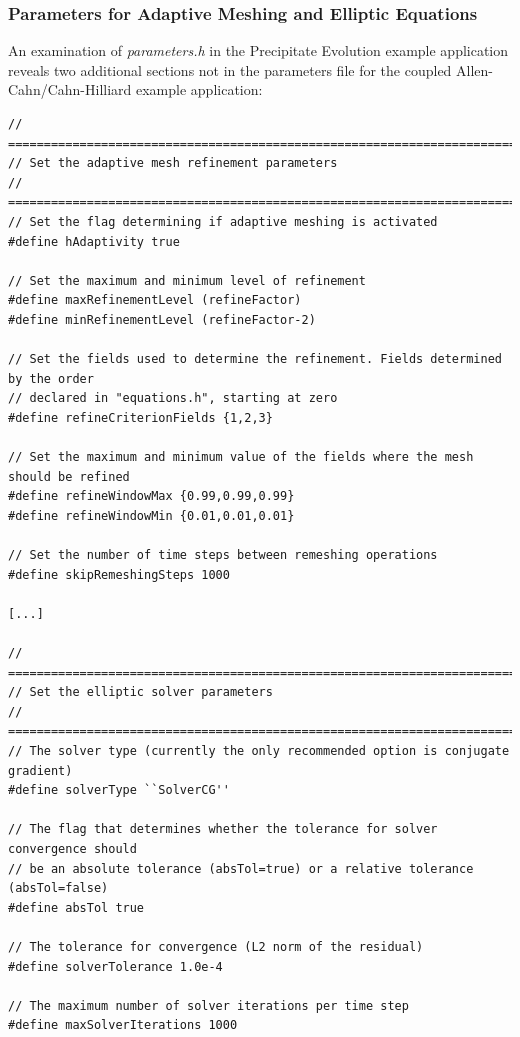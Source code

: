 \documentclass[10pt]{article} %
\begin{document}
\subsubsection{Parameters for Adaptive Meshing and Elliptic Equations}
An examination of \emph{parameters.h} in the Precipitate Evolution example application reveals two additional sections not in the parameters file for the coupled Allen-Cahn/Cahn-Hilliard example application:
\tiny
\begin{lstlisting}
// =================================================================================
// Set the adaptive mesh refinement parameters
// =================================================================================
// Set the flag determining if adaptive meshing is activated
#define hAdaptivity true

// Set the maximum and minimum level of refinement
#define maxRefinementLevel (refineFactor)
#define minRefinementLevel (refineFactor-2)

// Set the fields used to determine the refinement. Fields determined by the order
// declared in "equations.h", starting at zero
#define refineCriterionFields {1,2,3}

// Set the maximum and minimum value of the fields where the mesh should be refined
#define refineWindowMax {0.99,0.99,0.99}
#define refineWindowMin {0.01,0.01,0.01}

// Set the number of time steps between remeshing operations
#define skipRemeshingSteps 1000

[...]

// =================================================================================
// Set the elliptic solver parameters
// =================================================================================
// The solver type (currently the only recommended option is conjugate gradient)
#define solverType ``SolverCG''

// The flag that determines whether the tolerance for solver convergence should
// be an absolute tolerance (absTol=true) or a relative tolerance (absTol=false)
#define absTol true

// The tolerance for convergence (L2 norm of the residual)
#define solverTolerance 1.0e-4

// The maximum number of solver iterations per time step
#define maxSolverIterations 1000
\end{lstlisting}
\normalsize
\end{document}
